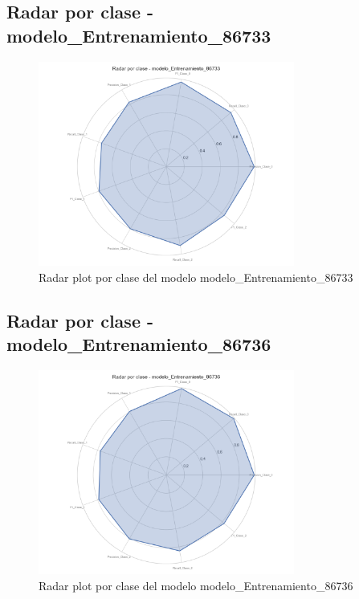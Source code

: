 \subsection{Radar por clase - modelo_Entrenamiento_86733}
\begin{figure}[H]
\centering
\includegraphics[width=0.75\textwidth]{Graficas/radar_modelo_Entrenamiento_86733.png}
\caption{Radar plot por clase del modelo modelo_Entrenamiento_86733}
\end{figure}

\subsection{Radar por clase - modelo_Entrenamiento_86736}
\begin{figure}[H]
\centering
\includegraphics[width=0.75\textwidth]{Graficas/radar_modelo_Entrenamiento_86736.png}
\caption{Radar plot por clase del modelo modelo_Entrenamiento_86736}
\end{figure}


